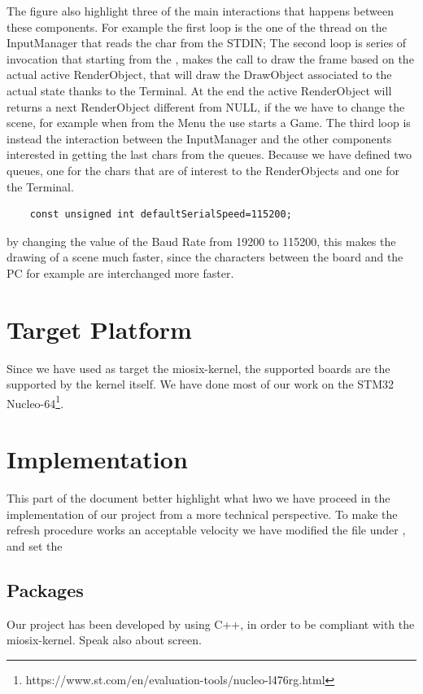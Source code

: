 \documentclass{article}
\begin{document}
The figure also highlight three of the main interactions that happens between these components.
For example the first loop is the one of the thread on the InputManager that reads the char from the STDIN;
The second loop is series of invocation that starting from the \label{main-loop}, makes the call to draw the frame based on the actual active RenderObject, that will draw the DrawObject associated to the actual state thanks to the Terminal.
At the end the active RenderObject will returns a next RenderObject different from NULL, if the we have to change the scene, for example when from the Menu the use starts a Game.
The third loop is instead the interaction between the InputManager and the other components interested in getting the last chars from the queues. Because we have defined two queues, one for the chars that are of interest to the RenderObjects and one for the Terminal.
\begin{verbatim}
    const unsigned int defaultSerialSpeed=115200;
\end{verbatim}
by changing the value of the Baud Rate from 19200 to 115200, this makes the drawing of a scene much faster, since the characters between the board and the PC for example are interchanged more faster.

\section{Target Platform}
Since we have used as target the miosix-kernel, the supported boards are the supported by the kernel itself. We have done most of our work on the STM32 Nucleo-64\footnote{https://www.st.com/en/evaluation-tools/nucleo-l476rg.html}.

\section{Implementation}
This part of the document better highlight what hwo we have proceed in the implementation of our project from a more technical perspective.
To make the refresh procedure works an acceptable velocity we have modified the file under , and set the 

\subsection{Packages}
Our project has been developed by using C++\cite{slidec++}, in order to be compliant with the miosix-kernel\cite{miosix}.
Speak also about screen.
\end{document}
